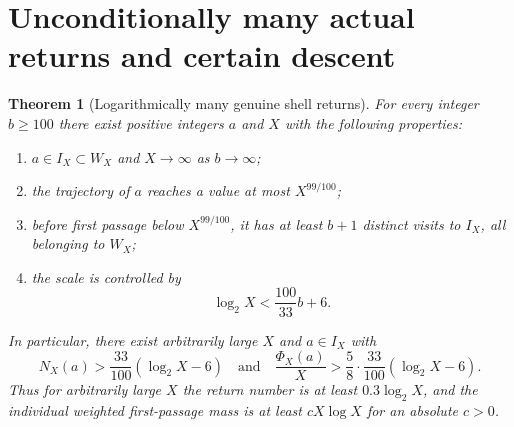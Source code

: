 \documentclass[11pt,a4paper]{article}
\newtheorem{theorem}{Theorem}
\begin{document}
\section{Unconditionally many actual returns and certain descent}
\begin{theorem}[Logarithmically many genuine shell returns]\label{thm:many}
For every integer $b\ge100$ there exist positive integers $a$ and
$X$ with the following properties:
\begin{enumerate}
 \item $a\in I_X\subset W_X$ and $X\to\infty$ as $b\to\infty$;
 \item the trajectory of $a$ reaches a value at most $X^{99/100}$;
 \item before first passage below $X^{99/100}$, it has at least
 $b+1$ \emph{distinct} visits to $I_X$, all belonging to $W_X$;
 \item the scale is controlled by
 \begin{equation}\label{eq:scale}
 \log_2 X<\frac{100}{33}b+6.
 \end{equation}
\end{enumerate}
In particular, there exist arbitrarily large $X$ and $a\in I_X$
with
\begin{equation}\label{eq:main}
 N_X(a)>\frac{33}{100}(\log_2X-6)
 \quad\text{and}\quad
 \frac{\Phi_X(a)}X>\frac58\cdot\frac{33}{100}(\log_2X-6).
\end{equation}
Thus for arbitrarily large $X$ the return number is at least
$0.3\log_2 X$, and the individual weighted first-passage mass is
at least $cX\log X$ for an absolute $c>0$.
\end{theorem}
\end{document}
